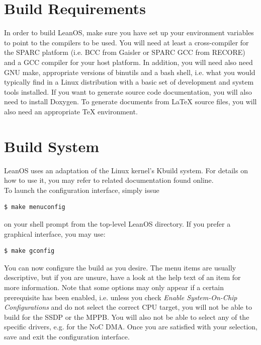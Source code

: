 \section {Build Requirements}

In order to build LeanOS, make sure you have set up your environment variables
to point to the compilers to be used. You will need at least a cross-compiler
for the \gls{SPARC} platform (i.e. BCC from Gaisler or SPARC GCC from RECORE)
and a \gls{GCC} compiler for your host platform. In addition, you will need
also need GNU make, appropriate versions of binutils and a bash shell, i.e.
what you would typically find in a Linux distribution with a basic set of
development and system tools installed. If you want to generate source code
documentation, you will also need to install \gls{Doxygen}. To generate
documents from LaTeX source files, you will also need an appropriate TeX
environment.

\section {Build System}

LeanOS uses an adaptation of the Linux kernel's Kbuild system. For details on
how to use it, you may refer to related documentation found online. \\

\noindent
To launch the configuration interface, simply issue 

\begin{lstlisting}[language=bash]
  $ make menuconfig
\end{lstlisting}
\noindent
on your shell prompt from the top-level LeanOS directory. If you prefer a
graphical interface, you may use:

\begin{lstlisting}[language=bash]
  $ make gconfig
\end{lstlisting}

\noindent
You can now configure the build as you desire. The menu items are usually
descriptive, but if you are unsure, have a look at the help text of an item for
more information. Note that some options may only appear if a certain
prerequisite has been enabled, i.e. unless you check \emph{Enable
System-On-Chip Configurations} and do not select the correct CPU target, you
will not be able to build for the \gls{SSDP} or the \gls{MPPB}.  You will also
not be able to select any of the specific drivers, e.g. for the \gls{NoC}
\gls{DMA}. Once you are satisfied with your selection, save and exit the
configuration interface.\\

